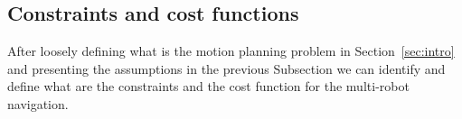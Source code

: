 \documentclass[eprint]{actapoly}
\begin{document}
\begin{enumerate}

%    

\end{enumerate}

\subsection{Constraints and cost functions}

After loosely defining what is the motion planning problem in
Section~\ref{sec:intro} and presenting the assumptions in the previous Subsection
we can identify and define what are the constraints and the cost function for the
multi-robot navigation.
\end{document}
